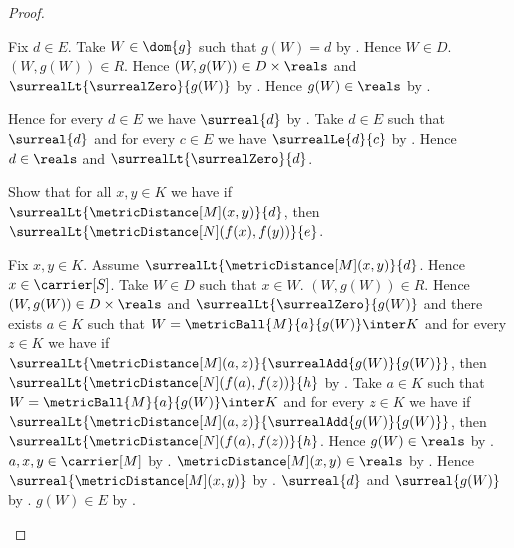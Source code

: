 \begin{proof}
\begin{subproof}
\begin{byCase}
\begin{subproof}
                Fix $d\in E$.
                Take $W\in\dom{g}$ such that $g(W)=d$ by
                    .
                Hence $W\in D$.
                $(W,g(W))\in R$.
                Hence $(W,g(W))\in D\times\reals$ and
                    $\surrealLt{\surrealZero}{g(W)}$ by \auto.
                Hence $g(W)\in\reals$ by .
            \end{subproof}
            Hence for every $d\in E$ we have $\surreal{d}$ by
                .
            Take $d\in E$ such that $\surreal{d}$ and for every
                $c\in E$ we have $\surrealLe{d}{c}$ by
                .
            Hence $d\in\reals$ and $\surrealLt{\surrealZero}{d}$.

            Show that for all $x,y\in K$ we have if
                $\surrealLt{\metricDistance[M](x,y)}{d}$, then
                $\surrealLt{\metricDistance[N](f(x),f(y))}{e}$.
            \begin{subproof}
                Fix $x,y\in K$.
                Assume $\surrealLt{\metricDistance[M](x,y)}{d}$.
                Hence $x\in\carrier[S]$.
                Take $W\in D$ such that $x\in W$.
                $(W,g(W))\in R$.
                Hence $(W,g(W))\in D\times\reals$ and
                    $\surrealLt{\surrealZero}{g(W)}$ and there exists
                    $a\in K$ such that
                    $W=\metricBall{M}{a}{g(W)}\inter K$ and
                    for every $z\in K$ we have if
                        $\surrealLt{\metricDistance[M](a,z)}
                            {\surrealAdd{g(W)}{g(W)}}$, then
                        $\surrealLt{\metricDistance[N](f(a),f(z))}{h}$
                    by \auto.
                Take $a\in K$ such that
                    $W=\metricBall{M}{a}{g(W)}\inter K$ and
                    for every $z\in K$ we have if
                        $\surrealLt{\metricDistance[M](a,z)}
                            {\surrealAdd{g(W)}{g(W)}}$, then
                        $\surrealLt{\metricDistance[N](f(a),f(z))}{h}$.
                Hence $g(W)\in\reals$ by .
                $a,x,y\in\carrier[M]$ by .
                $\metricDistance[M](x,y)\in\reals$ by
                    .
                Hence $\surreal{\metricDistance[M](x,y)}$ by
                    .
                $\surreal{d}$ and $\surreal{g(W)}$ by
                    .
                $g(W)\in E$ by .

\end{subproof}
\end{byCase}
\end{subproof}
\end{proof}
